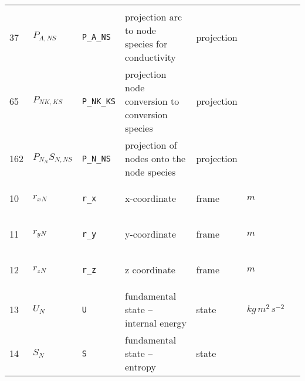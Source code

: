 \begin{longtable}{|p{1cm}|p{2.5cm}|p{4.5cm}|p{8cm}|p{3.0cm}|p{3cm}|p{1cm}|}
             & \\
    37
             & \hypertarget{"v:37"}{ $ {P}{_{A, {N S}}} $}
             & \verb|P_A_NS|
             & projection arc to node species for conductivity
             & \begin{lay}projection \end{lay}
             & $  $
             & \\
    65
             & \hypertarget{"v:65"}{ $ {P}{_{{N K}, {K S}}} $}
             & \verb|P_NK_KS|
             & projection node conversion to conversion species
             & \begin{lay}projection \end{lay}
             & $  $
             & \\
    162
             & \hypertarget{"v:162"}{ $ {P_N_NS}{_{N, {N S}}} $}
             & \verb|P_N_NS|
             & projection of nodes onto the node species
             & \begin{lay}projection \end{lay}
             & $  $
             & \\
    10
             & \hypertarget{"v:10"}{ $ {{r_x}}{_{N}} $}
             & \verb|r_x|
             & x-coordinate
             & \begin{lay}frame \end{lay}
             & $ m  $
             & \\
    11
             & \hypertarget{"v:11"}{ $ {{r_y}}{_{N}} $}
             & \verb|r_y|
             & y-coordinate
             & \begin{lay}frame \end{lay}
             & $ m  $
             & \\
    12
             & \hypertarget{"v:12"}{ $ {{r_z}}{_{N}} $}
             & \verb|r_z|
             & z coordinate
             & \begin{lay}frame \end{lay}
             & $ m  $
             & \\
    13
             & \hypertarget{"v:13"}{ $ {U}{_{N}} $}
             & \verb|U|
             & fundamental state -- internal energy
             & \begin{lay}state \end{lay}
             & $ kg \,m^{2} \,s^{-2} \, $
             & \\
    14
             & \hypertarget{"v:14"}{ $ {S}{_{N}} $}
             & \verb|S|
             & fundamental state -- entropy
             & \begin{lay}state \end{lay}

\end{longtable}
